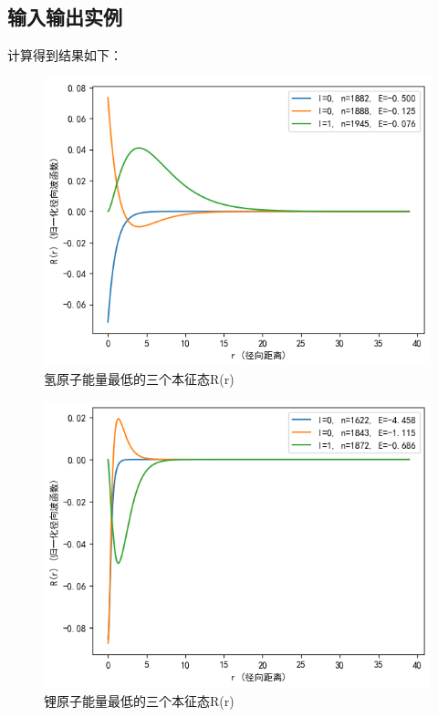 \documentclass[11pt]{article}
\begin{document}
\subsection{输入输出实例}
计算得到结果如下：

\begin{figure}[h]
    \centering
    \includegraphics[width=0.5\linewidth]{氢原子R.png}
    \caption{氢原子能量最低的三个本征态R(r)}
    \label{fig:my_label}
\end{figure}

\begin{figure}
    \centering
    \includegraphics[width=0.5\linewidth]{锂原子R.png}
    \caption{锂原子能量最低的三个本征态R(r)}
    \label{fig:my_label}
\end{figure}
\end{document}
